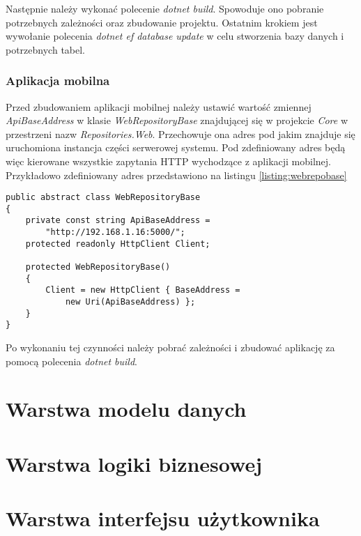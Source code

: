 Następnie należy wykonać polecenie \textit{dotnet build}. Spowoduje ono pobranie potrzebnych zależności oraz zbudowanie projektu. Ostatnim krokiem jest wywołanie polecenia \textit{dotnet ef database update} w celu stworzenia bazy danych i potrzebnych tabel.

\subsubsection{Aplikacja mobilna}
Przed zbudowaniem aplikacji mobilnej należy ustawić wartość zmiennej \textit{ApiBaseAddress} w klasie \textit{WebRepositoryBase} znajdującej się w projekcie \textit{Core} w przestrzeni nazw \textit{Repositories.Web}. Przechowuje ona adres pod jakim znajduje się uruchomiona instancja części serwerowej systemu. Pod zdefiniowany adres będą więc kierowane wszystkie zapytania HTTP wychodzące z aplikacji mobilnej. Przykładowo zdefiniowany adres przedstawiono na listingu \ref{listing:webrepobase}

\begin{lstlisting}[caption={Klasa zawierająca adres aplikacji serwerowej},label=listing:webrepobase]
public abstract class WebRepositoryBase
{
	private const string ApiBaseAddress = 
		"http://192.168.1.16:5000/";
	protected readonly HttpClient Client;

	protected WebRepositoryBase()
	{
		Client = new HttpClient { BaseAddress =
			new Uri(ApiBaseAddress) };
	}
}
\end{lstlisting}

Po wykonaniu tej czynności należy pobrać zależności i zbudować aplikację za pomocą polecenia \textit{dotnet build}.



\section{Warstwa modelu danych}
\section{Warstwa logiki biznesowej}
\section{Warstwa interfejsu użytkownika}